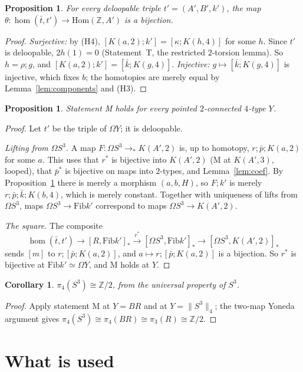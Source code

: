 \documentclass[11pt]{amsart}
\newtheorem{proposition}[theorem]{Proposition}
\newtheorem{corollary}[theorem]{Corollary}
\theoremstyle{definition}
\theoremstyle{remark}
\newcommand{\Om}{\Omega}
\newcommand{\Fib}{\mathrm{Fib}}
\newcommand{\Hom}{\mathrm{Hom}}
\newcommand{\Z}{\mathbb{Z}}
\newcommand{\cls}[1]{[#1]}
\newcommand{\cmp}{\mathbin{;}}
\begin{document}
\begin{proposition}\label{prop:theta4}
For every deloopable triple $t'=(A',B',k')$, the map
$\theta:\hom(\bar t,t')\to\Hom(\Z,A')$ is a bijection.
\end{proposition}
\begin{proof}
\emph{Surjective:} by (H4), $\cls{K(a,2)\cmp k'}=\cls{\kappa\cmp K(h,4)}$ for
some $h$. Since $t'$ is deloopable, $2h(1)=0$ (Statement~T, the restricted
$2$-torsion lemma). So $h=\rho\cmp g$, and
$\cls{K(a,2)\cmp k'}=\cls{\bar k\cmp K(g,4)}$.
\emph{Injective:} $g\mapsto\cls{\bar k\cmp K(g,4)}$ is injective, which fixes
$b$; the homotopies are merely equal by Lemma~\ref{lem:components} and (H3).
\end{proof}

\begin{proposition}
Statement M holds for every pointed $2$-connected $4$-type $Y$.
\end{proposition}
\begin{proof}
Let $t'$ be the triple of $\Om Y$; it is deloopable.

\emph{Lifting from $\Om S^3$.} A map $F:\Om S^3\to_*K(A',2)$ is, up to homotopy,
$r\cmp\bar p\cmp K(a,2)$ for some $a$. This uses that $r^*$ is bijective into
$K(A',2)$ (M at $K(A',3)$, looped), that $\bar p^*$ is bijective on maps into
$2$-types, and Lemma~\ref{lem:coef}. By Proposition~\ref{prop:theta4} there is
merely a morphism $(a,b,H)$, so $F\cmp k'$ is merely
$r\cmp\bar p\cmp\bar k\cmp K(b,4)$, which is merely constant. Together with
uniqueness of lifts from $\Om S^3$, maps $\Om S^3\to\Fib k'$ correspond to maps
$\Om S^3\to K(A',2)$.

\emph{The square.} The composite
\[\hom(\bar t,t')\to[R,\Fib k']_*\xrightarrow{r^*}[\Om S^3,\Fib k']_*\to[\Om S^3,K(A',2)]_*\]
sends $\cls m$ to $r\cmp\cls{\bar p\cmp K(a,2)}$, and
$a\mapsto r\cmp\cls{\bar p\cmp K(a,2)}$ is a bijection. So $r^*$ is bijective at
$\Fib k'\simeq\Om Y$, and M holds at $Y$.
\end{proof}

\begin{corollary}
$\pi_4(S^3)\cong\Z/2$, from the universal property of $S^3$.
\end{corollary}
\begin{proof}
Apply statement M at $Y=BR$ and at $Y=\|S^3\|_4$; the two-map Yoneda argument
gives $\pi_4(S^3)\cong\pi_4(BR)\cong\pi_3(R)\cong\Z/2$.
\end{proof}

\section{What is used}
\end{document}
